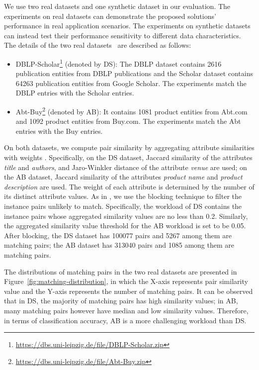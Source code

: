   We use two real datasets and one synthetic dataset in our evaluation. The experiments on real datasets can demonstrate the proposed solutions' performance in real application scenarios. The experiments on synthetic datasets can instead test their performance sensitivity to different data characteristics. The details of the two real datasets~\cite{kopcke2010evaluation} are described as follows:
\begin{itemize}
\item DBLP-Scholar\footnote{\url{https://dbs.uni-leipzig.de/file/DBLP-Scholar.zip}} (denoted by DS): The DBLP dataset contains 2616 publication entities from DBLP publications and the Scholar dataset contains 64263 publication entities from Google Scholar. The experiments match the DBLP entries with the Scholar entries.
\item Abt-Buy\footnote{\url{https://dbs.uni-leipzig.de/file/Abt-Buy.zip}} (denoted by AB): It contains 1081 product entities from Abt.com and 1092 product entities from Buy.com. The experiments match the Abt entries with the Buy entries.
\end{itemize}


  On both datasets, we compute pair similarity by aggregating attribute similarities with weights \cite{christen2012data}.  Specifically, on the DS dataset, Jaccard similarity of the attributes {\em title} and {\em authors}, and Jaro-Winkler distance of the attribute {\em venue} are used; on the AB dataset, Jaccard similarity of the attributes {\em product name} and {\em product description} are used. The weight of each attribute is determined by the number of its distinct attribute values. As in \cite{arasu2010active}, we use the blocking technique to filter the instance pairs unlikely to match. Specifically, the workload of DS contains the instance pairs whose aggregated similarity values are no less than 0.2. Similarly, the aggregated similarity value threshold for the AB workload is set to be 0.05. After blocking, the DS dataset has 100077 pairs and 5267 among them are matching pairs; the AB dataset has 313040 pairs and 1085 among them are matching pairs.

 The distributions of matching pairs in the two real datasets are presented in Figure~\ref{fig:matching-distribution}, in which the X-axis represents pair similarity value and the Y-axis represents the number of matching pairs. It can be observed that in DS, the majority of matching pairs has high similarity values; in AB, many matching pairs however have median and low similarity values. Therefore, in terms of classification accuracy, AB is a more challenging workload than DS.



